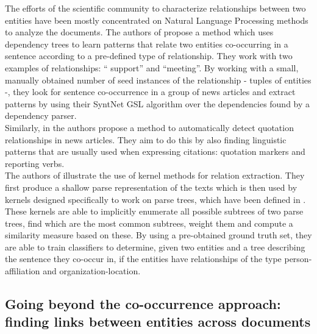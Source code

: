The efforts of the scientific community to characterize relationships between two entities have been mostly concentrated on Natural Language Processing methods to analyze the documents. The authors of \cite{syntactic-template} propose a method which uses dependency trees to learn patterns that relate two entities co-occurring in a sentence according to a pre-defined type of relationship. They work with two examples of relationships: `` support'' and ``meeting''. By working with a small, manually obtained number of seed instances of the relationship - tuples of entities -, they look for sentence co-occurrence in a group of news articles and extract patterns by using their SyntNet GSL algorithm over the dependencies found by a dependency parser. \\

Similarly, in \cite{news-quotation} the authors propose a method to automatically detect quotation relationships in news articles. They aim to do this by also finding linguistic patterns that are usually used when expressing citations: quotation markers and reporting verbs. \\

The authors of \cite{kernel-relation-extraction} illustrate the use of kernel methods for relation extraction. They first produce a shallow parse representation of the texts which is then used by kernels designed specifically to work on parse trees, which have been defined in \cite{tree-kernel}. These kernels are able to implicitly enumerate all possible subtrees of two parse trees, find which are the most common subtrees, weight them and compute a similarity measure based on these. By using a pre-obtained ground truth set, they are able to train classifiers to determine, given two entities and a tree describing the sentence they co-occur in, if the entities have relationships of the type person-affiliation and organization-location.\\

\subsection{Going beyond the co-occurrence approach: finding links between entities across documents}\label{topics}


